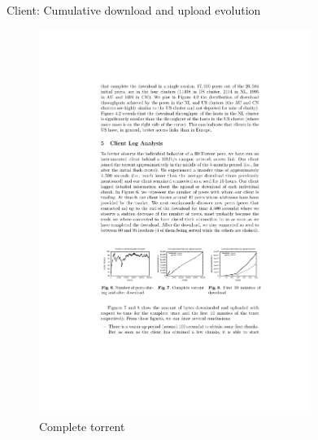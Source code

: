 \begin{frame}{Client: Cumulative download and upload evolution}
	
\begin{figure}	
	\includegraphics[width=0.79\textwidth]{bt-fig3}
	\caption{Complete torrent}
\end{figure}	
	
\end{frame}

